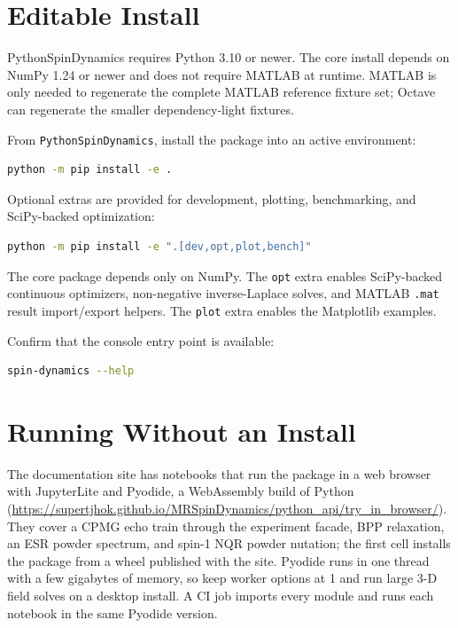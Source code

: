 \documentclass[11pt,oneside]{report}
\newcommand{\code}[1]{\texttt{#1}}
\begin{document}
\section{Editable Install}

PythonSpinDynamics requires Python 3.10 or newer. The core install depends on
NumPy 1.24 or newer and does not require MATLAB at runtime. MATLAB is only
needed to regenerate the complete MATLAB reference fixture set; Octave can
regenerate the smaller dependency-light fixtures.

From \code{PythonSpinDynamics}, install the package into an active environment:

\begin{lstlisting}[language=bash]
python -m pip install -e .
\end{lstlisting}

Optional extras are provided for development, plotting, benchmarking, and
SciPy-backed optimization:

\begin{lstlisting}[language=bash]
python -m pip install -e ".[dev,opt,plot,bench]"
\end{lstlisting}

The core package depends only on NumPy. The \code{opt} extra enables SciPy-backed
continuous optimizers, non-negative inverse-Laplace solves, and MATLAB
\code{.mat} result import/export helpers. The \code{plot} extra enables the
Matplotlib examples.

Confirm that the console entry point is available:

\begin{lstlisting}[language=bash]
spin-dynamics --help
\end{lstlisting}

\section{Running Without an Install}

The documentation site has notebooks that run the package in a web browser
with JupyterLite and Pyodide, a WebAssembly build of Python
(\url{https://supertjhok.github.io/MRSpinDynamics/python_api/try_in_browser/}).
They cover a CPMG echo train through the experiment facade, BPP relaxation,
an ESR powder spectrum, and spin-1 NQR powder nutation; the first cell installs
the package from a wheel published with the site. Pyodide runs in one thread
with a few gigabytes of memory, so keep worker options at 1 and run large 3-D
field solves on a desktop install. A CI job imports every module and runs each
notebook in the same Pyodide version.
\end{document}
